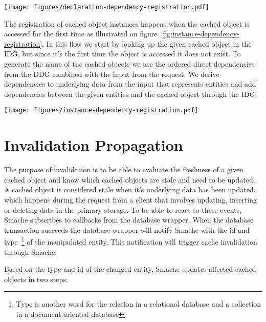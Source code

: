 \begin{figure*}[ht!]
  \centering
  \texttt{[image: figures/declaration-dependency-registration.pdf]}
  \caption{The flow in which lazy and direct dependencies are registered from the declarations}
  \label{fig:declaration-dependency-registration}
\end{figure*}

The registration of cached object instances happens when the cached object is accessed for the first time as illustrated on figure~\ref{fig:instance-dependency-registration}. In this flow we start by looking up the given cached object in the IDG, but since it's the first time the object is accessed it does not exist. To generate the name of the cached objects we use the ordered direct dependencies from the DDG combined with the input from the request. We derive dependencies to underlying data from the input that represents entities and add dependencies between the given entities and the cached object through the IDG.

\begin{figure*}[ht!]
  \centering
  \texttt{[image: figures/instance-dependency-registration.pdf]}
  \caption{The flow in which cached object instances are accessed when they are accessed the first time}
  \label{fig:instance-dependency-registration}
\end{figure*}

\section{Invalidation Propagation}
\label{sec:invalidation-propagation}

The purpose of invalidation is to be able to evaluate the freshness of a given cached object and know which cached objects are stale and need to be updated. A cached object is considered stale when it's underlying data has been updated, which happens during the request from a client that involves updating, inserting or deleting data in the primary storage. To be able to react to these events, Smache subscribes to callbacks from the database wrapper. When the database transaction succeeds the database wrapper will notify Smache with the id and type~\footnote{Type is another word for the relation in a relational database and a collection in a document-oriented database} of the manipulated entity. This notification will trigger cache invalidation through Smache.

Based on the type and id of the changed entity, Smache updates affected cached objects in two steps:

